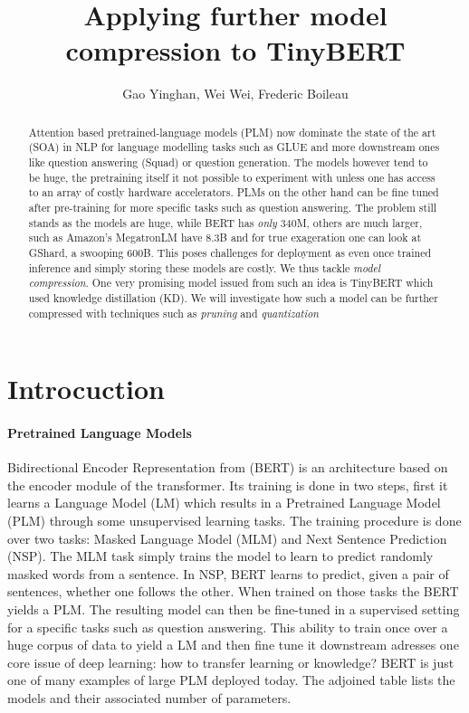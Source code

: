 \documentclass{article}
\title{\textbf{Applying further model compression to TinyBERT}}
\author{Gao Yinghan, Wei Wei, Frederic Boileau}
\begin{document}
\thispagestyle{plain}
\maketitle
\medskip

\begin{abstract}
    Attention based pretrained-language models (PLM) now dominate
  the state of the art (SOA) in NLP for language modelling tasks such as GLUE and
  more downstream ones like question answering (Squad) or question generation. The
  models however tend to be huge, the pretraining itself it not possible to
  experiment with unless one has access to an array of costly hardware
  accelerators. PLMs on the other hand can be fine tuned after pre-training for
  more specific tasks such as question answering. The problem still stands as the
  models are huge, while BERT has \textit{only} 340M, others are much larger, such
  as Amazon's MegatronLM have 8.3B and for true exageration one can look at
  GShard, a swooping 600B. This poses challenges for deployment as even once
  trained inference and simply storing these models are costly.  We thus tackle
  \textit{model compression}. One very promising model issued from such an idea is
  TinyBERT which used knowledge distillation (KD). We will investigate how such a
  model can be further compressed with techniques such as \textit{pruning} and
  \textit{quantization}
\end{abstract}

\section{Introcuction}


\paragraph{Pretrained Language Models}Bidirectional Encoder Representation from
(BERT)\cite{bert} is an architecture based on the encoder module of the
transformer. Its training is done in two steps, first it learns a Language Model
(LM) which results in a Pretrained Language Model (PLM) through some
unsupervised learning tasks. The training procedure is done over two tasks:
Masked Language Model (MLM) and Next Sentence Prediction (NSP). The MLM task
simply trains the model to learn to predict randomly masked words from a
sentence. In NSP, BERT learns to predict, given a pair of sentences, whether one
follows the other. When trained on those tasks the BERT yields a PLM. The
resulting model can then be fine-tuned in a supervised setting for a specific
tasks such as question answering. This ability to train once over a huge corpus
of data to yield a LM and then fine tune it downstream adresses one core issue
of deep learning: how to transfer learning or knowledge?
BERT is just one of many examples of large PLM deployed today. The
adjoined table lists the models and their associated number of parameters.
\end{document}
